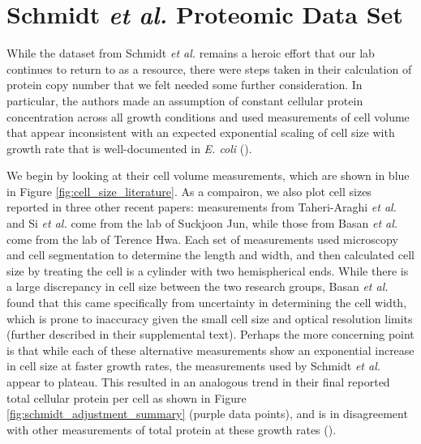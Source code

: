 \section{Schmidt \textit{et al.} Proteomic Data Set}
\label{sec:SI_schmidt}


While the dataset from Schmidt \textit{et al.} remains a heroic effort that our lab
continues to return to as a resource,
there were steps taken in their calculation of protein copy number
that we felt needed some further consideration. In particular, the authors made an assumption of
constant cellular protein concentration across all growth conditions and
used measurements of cell volume that appear inconsistent with an expected
exponential scaling of cell size with growth rate that is well-documented in
\textit{E. coli} (\cite{schaechter1958, taheriaraghi2015, si2017}).

We begin by looking at their cell volume measurements, which are shown in blue in Figure \ref{fig:cell_size_literature}.
As a compairon, we also plot cell sizes reported in three other recent papers:
measurements from Taheri-Araghi \textit{et al.} and Si \textit{et al.} come from
the lab of Suckjoon Jun, while those from Basan \textit{et al.} come  from the lab
of Terence Hwa.  Each set of measurements used microscopy and cell segmentation to determine the
length and width, and then calculated cell size by treating the cell is a
cylinder with two hemispherical ends. While there is a large discrepancy in cell
size between the two research groups, Basan \textit{et al.} found that this came
specifically from uncertainty in determining the cell width, which is prone to
inaccuracy given the small cell size and optical resolution limits (further described in their supplemental text). Perhaps the
more concerning point is that while each of these alternative measurements show
an exponential increase in  cell size at faster growth rates, the
measurements used by Schmidt \textit{et al.} appear to plateau. This resulted in an analogous trend in their final reported total
cellular protein per cell as shown in Figure \ref{fig:schmidt_adjustment_summary} (purple data points),
 and is in disagreement with other measurements of total protein at these
 growth rates (\cite{basan2015}).

